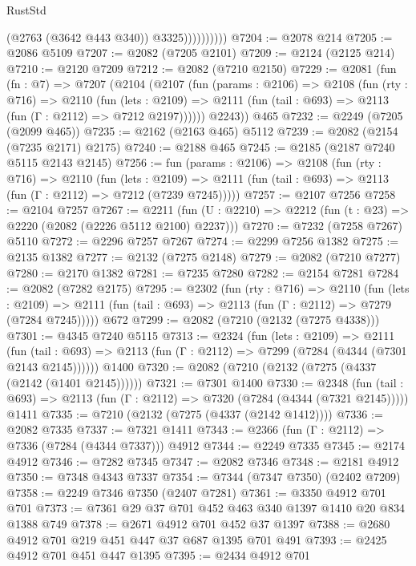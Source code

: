 \begin{lexlean}{RustStd}
\begin{coremodule}
                        (@2763 (@3642 @443 @340))
                        @3325))))))))))
@7204 := @2078 @214
@7205 := @2086 @5109
@7207 := @2082 (@7205 @2101)
@7209 := @2124 (@2125 @214)
@7210 := @2120 @7209
@7212 := @2082 (@7210 @2150)
@7229 := @2081
    (fun (fn : @7) =>
    @7207
      (@2104
        (@2107
          (fun (params : @2106) =>
          @2108
            (fun (rty : @716) =>
            @2110
              (fun (lets : @2109) =>
              @2111 (fun (tail : @693) => @2113 (fun (Γ : @2112) => @7212 @2197))))))
        @2243))
    @465
@7232 := @2249 (@7205 (@2099 @465))
@7235 := @2162 (@2163 @465) @5112
@7239 := @2082 (@2154 (@7235 @2171) @2175)
@7240 := @2188 @465
@7245 := @2185 (@2187 @7240 @5115 @2143 @2145)
@7256 := fun (params : @2106) =>
  @2108
    (fun (rty : @716) =>
    @2110
      (fun (lets : @2109) =>
      @2111 (fun (tail : @693) => @2113 (fun (Γ : @2112) => @7212 (@7239 @7245)))))
@7257 := @2107 @7256
@7258 := @2104 @7257
@7267 := @2211 (fun (U : @2210) => @2212 (fun (t : @23) => @2220 (@2082 (@2226 @5112 @2100) @2237)))
@7270 := @7232 (@7258 @7267) @5110
@7272 := @2296 @7257 @7267
@7274 := @2299 @7256 @1382
@7275 := @2135 @1382
@7277 := @2132 (@7275 @2148)
@7279 := @2082 (@7210 @7277)
@7280 := @2170 @1382
@7281 := @7235 @7280
@7282 := @2154 @7281
@7284 := @2082 (@7282 @2175)
@7295 := @2302
    (fun (rty : @716) =>
    @2110
      (fun (lets : @2109) =>
      @2111 (fun (tail : @693) => @2113 (fun (Γ : @2112) => @7279 (@7284 @7245)))))
    @672
@7299 := @2082 (@7210 (@2132 (@7275 @4338)))
@7301 := @4345 @7240 @5115
@7313 := @2324
    (fun (lets : @2109) =>
    @2111
      (fun (tail : @693) => @2113 (fun (Γ : @2112) => @7299 (@7284 (@4344 (@7301 @2143 @2145))))))
    @1400
@7320 := @2082 (@7210 (@2132 (@7275 (@4337 (@2142 (@1401 @2145))))))
@7321 := @7301 @1400
@7330 := @2348
    (fun (tail : @693) => @2113 (fun (Γ : @2112) => @7320 (@7284 (@4344 (@7321 @2145)))))
    @1411
@7335 := @7210 (@2132 (@7275 (@4337 (@2142 @1412))))
@7336 := @2082 @7335
@7337 := @7321 @1411
@7343 := @2366 (fun (Γ : @2112) => @7336 (@7284 (@4344 @7337))) @4912
@7344 := @2249 @7335
@7345 := @2174 @4912
@7346 := @7282 @7345
@7347 := @2082 @7346
@7348 := @2181 @4912
@7350 := @7348 @4343 @7337
@7354 := @7344 (@7347 @7350) (@2402 @7209)
@7358 := @2249 @7346 @7350 (@2407 @7281)
@7361 := @3350 @4912 @701 @701
@7373 := @7361 @29 @37 @701 @452 @463 @340 @1397 @1410 @20 @834 @1388 @749
@7378 := @2671 @4912 @701 @452 @37 @1397
@7388 := @2680 @4912 @701 @219 @451 @447 @37 @687 @1395 @701 @491
@7393 := @2425 @4912 @701 @451 @447 @1395
@7395 := @2434 @4912 @701

\end{coremodule}
\end{lexlean}
